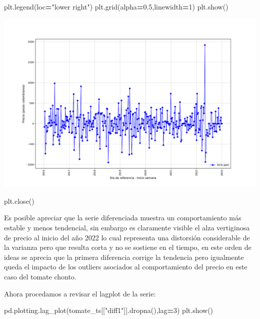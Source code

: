 \documentclass[
]{book}
\newenvironment{Shaded}{\begin{snugshade}}{\end{snugshade}}
\newcommand{\DecValTok}[1]{\textcolor[rgb]{0.00,0.00,0.81}{#1}}
\newcommand{\FloatTok}[1]{\textcolor[rgb]{0.00,0.00,0.81}{#1}}
\newcommand{\NormalTok}[1]{#1}
\newcommand{\OperatorTok}[1]{\textcolor[rgb]{0.81,0.36,0.00}{\textbf{#1}}}
\newcommand{\StringTok}[1]{\textcolor[rgb]{0.31,0.60,0.02}{#1}}
\begin{document}
\begin{Shaded}
\begin{Highlighting}[]
\NormalTok{plt.legend(loc}\OperatorTok{=}\StringTok{"lower right"}\NormalTok{)}
\NormalTok{plt.grid(alpha}\OperatorTok{=}\FloatTok{0.5}\NormalTok{,linewidth}\OperatorTok{=}\DecValTok{1}\NormalTok{)}
\NormalTok{plt.show()}
\end{Highlighting}
\end{Shaded}

\includegraphics{bookdown-demo_files/figure-latex/unnamed-chunk-80-51.pdf}

\begin{Shaded}
\begin{Highlighting}[]
\NormalTok{plt.close()}
\end{Highlighting}
\end{Shaded}

Es posible apreciar que la serie diferenciada muestra un comportamiento más estable y menos tendencial, sin embargo es claramente visible el alza vertiginosa de precio al inicio del año 2022 lo cual representa una distorsión considerable de la varianza pero que resulta corta y no se sostiene en el tiempo, en este orden de ideas se aprecia que la primera diferencia corrige la tendencia pero igualmente queda el impacto de los outliers asociados al comportamiento del precio en este caso del tomate chonto.

Ahora procedamos a revisar el lagplot de la serie:

\begin{Shaded}
\begin{Highlighting}[]

\NormalTok{pd.plotting.lag\_plot(tomate\_ts[[}\StringTok{"diff1"}\NormalTok{]].dropna(),lag}\OperatorTok{=}\DecValTok{3}\NormalTok{)}
\NormalTok{plt.show()}
\end{Highlighting}
\end{Shaded}
\end{document}
